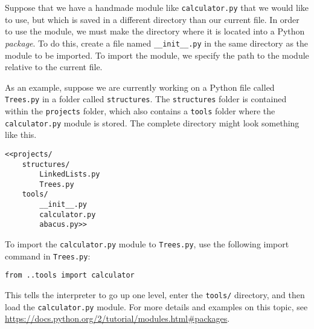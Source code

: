 Suppose that we have a handmade module like \texttt{calculator.py} that we would like to use, but which is saved in a different directory than our current file.
In order to use the module, we must make the directory where it is located into a Python \emph{package}.
To do this, create a file named \texttt{\_\_init\_\_.py} in the same directory as the module to be imported.
To import the module, we specify the path to the module relative to the current file.

As an example, suppose we are currently working on a Python file called \texttt{Trees.py} in a folder called \texttt{structures}.
The \texttt{structures} folder is contained within the \texttt{projects} folder, which also contains a \texttt{tools} folder where the \texttt{calculator.py} module is stored.
The complete directory might look something like this.

\begin{lstlisting}
<<projects/
    structures/
        LinkedLists.py
        Trees.py
    tools/
        __init__.py
        calculator.py
        abacus.py>>
\end{lstlisting}

To import the \texttt{calculator.py} module to \texttt{Trees.py}, use the following import command in \texttt{Trees.py}:

\begin{lstlisting}
from ..tools import calculator
\end{lstlisting}

This tells the interpreter to go up one level, enter the \texttt{tools/} directory, and then load the \texttt{calculator.py} module.
For more details and examples on this topic, see \url{https://docs.python.org/2/tutorial/modules.html\#packages}.



